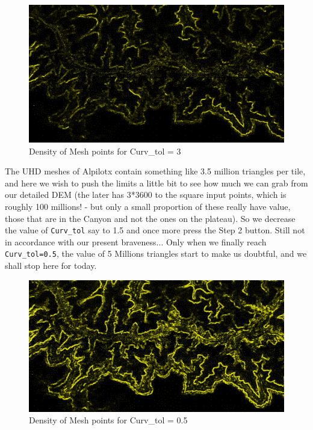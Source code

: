 \documentclass[12pt]{article}
\begin{document}
\begin{center}
\begin{figure}[!ht]
\begin{center}
\includegraphics[width=16cm]{Images/grand_canyon_nodes1.png}
\caption{\label{fig:grand_canyon_nodes1}Density of Mesh points for Curv\_tol = 3}
\end{center}
\end{figure}
\end{center}

The UHD meshes of Alpilotx contain something like 3.5 million triangles per tile, and here we wish to push the limits a little bit to see how much we can grab from our detailed DEM (the later has 3*3600 to the square input points, which is roughly 100 millions! - but only a small proportion of these really have value, those that are in the Canyon and not the ones on the plateau). So we decrease the value of {\tt Curv\_tol} say to 1.5 and once more press the Step 2 button. Still not in accordance with our present braveness... Only when we finally reach {\tt Curv\_tol=0.5}, the value of 5 Millions triangles start to make us doubtful, and we shall stop here for today.

\begin{center}
\begin{figure}[!ht]
\begin{center}
\includegraphics[width=16cm]{Images/grand_canyon_nodes2.png}
\caption{\label{fig:grand_canyon_nodes2}Density of Mesh points for Curv\_tol = 0.5}
\end{center}
\end{figure}
\end{center}
\end{document}

